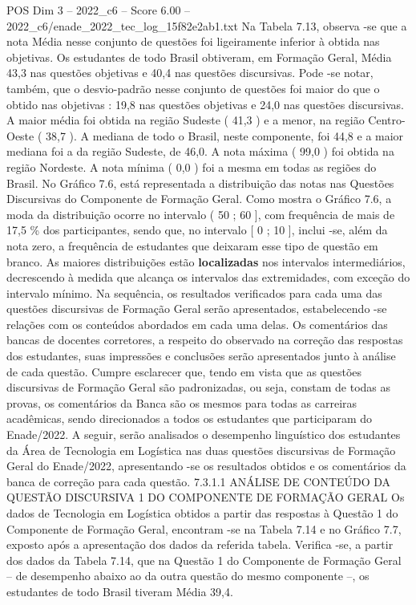 \begin{textsample}{POS Dim 3 – 2022\_c6 – Score 6.00 – 2022\_c6/enade\_2022\_tec\_log\_15f82e2ab1.txt}
Na Tabela 7.13, observa -se que a nota Média nesse conjunto de questões foi ligeiramente inferior à obtida nas objetivas.
Os estudantes de todo Brasil obtiveram, em Formação Geral, Média 43,3 nas questões objetivas e 40,4 nas questões discursivas.
Pode -se notar, também, que o desvio-padrão nesse conjunto de questões foi maior do que o obtido nas objetivas : 19,8 nas questões objetivas e 24,0 nas questões discursivas.
A maior média foi obtida na região Sudeste ( 41,3 ) e a menor, na região Centro-Oeste ( 38,7 ).
A mediana de todo o Brasil, neste componente, foi 44,8 e a maior mediana foi a da região Sudeste, de 46,0.
A nota máxima ( 99,0 ) foi obtida na região Nordeste.
A nota mínima ( 0,0 ) foi a mesma em todas as regiões do Brasil.
No Gráfico 7.6, está representada a distribuição das notas nas Questões Discursivas do Componente de Formação Geral.
Como mostra o Gráfico 7.6, a moda da distribuição ocorre no intervalo ( 50 ; 60 ], com frequência de mais de 17,5 \% dos participantes, sendo que, no intervalo [ 0 ; 10 ], inclui -se, além da nota zero, a frequência de estudantes que deixaram esse tipo de questão em branco.
As maiores distribuições estão \textbf{localizadas} nos intervalos intermediários, decrescendo à medida que alcança os intervalos das extremidades, com exceção do intervalo mínimo.
Na sequência, os resultados verificados para cada uma das questões discursivas de Formação Geral serão apresentados, estabelecendo -se relações com os conteúdos abordados em cada uma delas.
Os comentários das bancas de docentes corretores, a respeito do observado na correção das respostas dos estudantes, suas impressões e conclusões serão apresentados junto à análise de cada questão.
Cumpre esclarecer que, tendo em vista que as questões discursivas de Formação Geral são padronizadas, ou seja, constam de todas as provas, os comentários da Banca são os mesmos para todas as carreiras acadêmicas, sendo direcionados a todos os estudantes que participaram do Enade/2022.
A seguir, serão analisados o desempenho linguístico dos estudantes da Área de Tecnologia em Logística nas duas questões discursivas de Formação Geral do Enade/2022, apresentando -se os resultados obtidos e os comentários da banca de correção para cada questão. 7.3.1.1 ANÁLISE DE CONTEÚDO DA QUESTÃO DISCURSIVA 1 DO COMPONENTE DE FORMAÇÃO GERAL Os dados de Tecnologia em Logística obtidos a partir das respostas à Questão 1 do Componente de Formação Geral, encontram -se na Tabela 7.14 e no Gráfico 7.7, exposto após a apresentação dos dados da referida tabela.
Verifica -se, a partir dos dados da Tabela 7.14, que na Questão 1 do Componente de Formação Geral – de desempenho abaixo ao da outra questão do mesmo componente –, os estudantes de todo Brasil tiveram Média 39,4.

\end{textsample}
